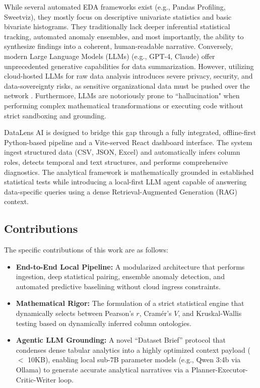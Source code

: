 \documentclass[conference]{IEEEtran}
\begin{document}
While several automated EDA frameworks exist (e.g., Pandas Profiling, Sweetviz), they mostly focus on descriptive univariate statistics and basic bivariate histograms. They traditionally lack deeper inferential statistical tracking, automated anomaly ensembles, and most importantly, the ability to synthesize findings into a coherent, human-readable narrative. Conversely, modern Large Language Models (LLMs) (e.g., GPT-4, Claude) offer unprecedented generative capabilities for data summarization. However, utilizing cloud-hosted LLMs for raw data analysis introduces severe privacy, security, and data-sovereignty risks, as sensitive organizational data must be pushed over the network \cite{zhao2023}. Furthermore, LLMs are notoriously prone to ``hallucination" when performing complex mathematical transformations or executing code without strict sandboxing and grounding.

DataLens AI is designed to bridge this gap through a fully integrated, offline-first Python-based pipeline and a Vite-served React dashboard interface. The system ingest structured data (CSV, JSON, Excel) and automatically infers column roles, detects temporal and text structures, and performs comprehensive diagnostics. The analytical framework is mathematically grounded in established statistical tests while introducing a local-first LLM agent capable of answering data-specific queries using a dense Retrieval-Augmented Generation (RAG) context. 

\subsection{Contributions}
The specific contributions of this work are as follows:
\begin{itemize}
    \item \textbf{End-to-End Local Pipeline:} A modularized architecture that performs ingestion, deep statistical pairing, ensemble anomaly detection, and automated predictive baselining without cloud ingress constraints.
    \item \textbf{Mathematical Rigor:} The formulation of a strict statistical engine that dynamically selects between Pearson's $r$, Cram\'er's $V$, and Kruskal-Wallis testing based on dynamically inferred column ontologies.
    \item \textbf{Agentic LLM Grounding:} A novel ``Dataset Brief'' protocol that condenses dense tabular analytics into a highly optimized context payload ($<$ 10KB), enabling local sub-7B parameter models (e.g., Qwen 3:4b via Ollama) to generate accurate analytical narratives via a Planner-Executor-Critic-Writer loop.
\end{itemize}
\end{document}
